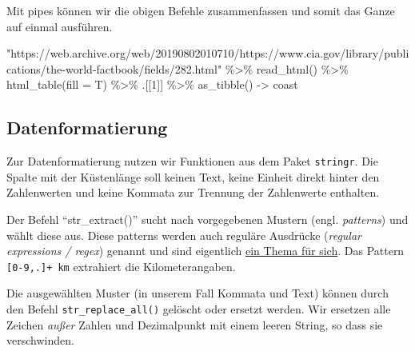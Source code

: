 \documentclass[11pt,german,a4paper]{article}
\newenvironment{Shaded}{\begin{snugshade}}{\end{snugshade}}
\newcommand{\AttributeTok}[1]{\textcolor[rgb]{0.77,0.63,0.00}{#1}}
\newcommand{\DecValTok}[1]{\textcolor[rgb]{0.00,0.00,0.81}{#1}}
\newcommand{\FunctionTok}[1]{\textcolor[rgb]{0.00,0.00,0.00}{#1}}
\newcommand{\NormalTok}[1]{#1}
\newcommand{\OtherTok}[1]{\textcolor[rgb]{0.56,0.35,0.01}{#1}}
\newcommand{\SpecialCharTok}[1]{\textcolor[rgb]{0.00,0.00,0.00}{#1}}
\newcommand{\StringTok}[1]{\textcolor[rgb]{0.31,0.60,0.02}{#1}}
\begin{document}
Mit pipes können wir die obigen Befehle zusammenfassen und somit das Ganze auf einmal ausführen.

\begin{Shaded}
\begin{Highlighting}[]
\StringTok{"https://web.archive.org/web/20190802010710/https://www.cia.gov/library/publications/the{-}world{-}factbook/fields/282.html"} \SpecialCharTok{\%\textgreater{}\%}
  \FunctionTok{read\_html}\NormalTok{() }\SpecialCharTok{\%\textgreater{}\%}
  \FunctionTok{html\_table}\NormalTok{(}\AttributeTok{fill =}\NormalTok{ T) }\SpecialCharTok{\%\textgreater{}\%}
\NormalTok{  .[[}\DecValTok{1}\NormalTok{]] }\SpecialCharTok{\%\textgreater{}\%}
  \FunctionTok{as\_tibble}\NormalTok{() }\OtherTok{{-}\textgreater{}}\NormalTok{ coast}
\end{Highlighting}
\end{Shaded}

\hypertarget{datenformatierung}{%
\subsection{Datenformatierung}\label{datenformatierung}}

Zur Datenformatierung nutzen wir Funktionen aus dem Paket \texttt{stringr}. Die Spalte mit der Küstenlänge soll keinen Text, keine Einheit direkt hinter den Zahlenwerten und keine Kommata zur Trennung der Zahlenwerte enthalten.

Der Befehl ``str\_extract()'' sucht nach vorgegebenen Mustern (engl. \emph{patterns}) und wählt diese aus. Diese patterns werden auch reguläre Ausdrücke (\emph{regular expressions / regex}) genannt und sind eigentlich \href{https://danielfett.de/en/tutorials/tutorial-regulare-ausdrucke/}{ein Thema für sich}. Das Pattern \texttt{{[}0-9,.{]}+\ km} extrahiert die Kilometerangaben.

\begin{Shaded}
\end{Shaded}

Die ausgewählten Muster (in unserem Fall Kommata und Text) können durch den Befehl \texttt{str\_replace\_all()} gelöscht oder ersetzt werden. Wir ersetzen alle Zeichen \emph{außer} Zahlen und Dezimalpunkt mit einem leeren String, so dass sie verschwinden.
\end{document}
